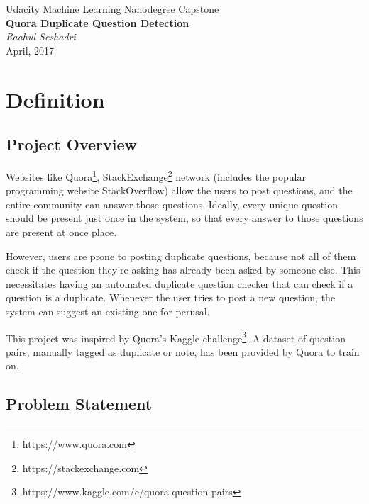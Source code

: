 \documentclass{article}
\begin{document}
\begin{titlepage}
    \begin{center}
        \Large{Udacity Machine Learning Nanodegree Capstone}\\
        \LARGE\textbf{Quora Duplicate Question Detection}\\
        \vspace{1cm}
        \large\textit{Raahul Seshadri}\\
        \normalsize{April, 2017}
    \end{center}
\end{titlepage}

\tableofcontents
\newpage

\section{Definition}

\subsection{Project Overview}
Websites like Quora\footnote{https://www.quora.com}, StackExchange\footnote{https://stackexchange.com} network (includes the popular programming website StackOverflow) allow the users to post questions, and the entire community can answer those questions. Ideally, every unique question should be present just once in the system, so that every answer to those questions are present at once place.

However, users are prone to posting duplicate questions, because not all of them check if the question they're asking has already been asked by someone else. This necessitates having an automated duplicate question checker that can check if a question is a duplicate. Whenever the user tries to post a new question, the system can suggest an existing one for perusal.

This project was inspired by Quora's Kaggle challenge\footnote{https://www.kaggle.com/c/quora-question-pairs}. A dataset of question pairs, manually tagged as duplicate or note, has been provided by Quora to train on.

\subsection{Problem Statement}
\end{document}
